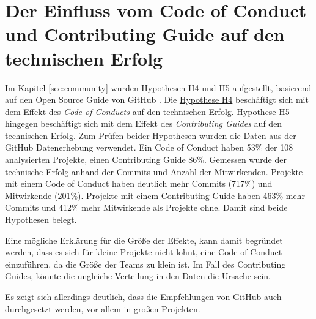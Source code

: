 



\section{Der Einfluss vom Code of Conduct und Contributing Guide auf den technischen Erfolg}

Im Kapitel \ref{sec:community} wurden Hypothesen H4 und H5 aufgestellt, basierend auf den Open Source
Guide von GitHub \cite{GitHubBuildingWelcomingCommunities2022}.
Die \hyperref[H:4]{Hypothese H4} beschäftigt sich mit dem Effekt des \textit{Code of Conducts} auf
den technischen Erfolg. \hyperref[H:5]{Hypothese H5} hingegen beschäftigt sich mit dem Effekt des
\textit{Contributing Guides} auf den technischen Erfolg.
Zum Prüfen beider Hypothesen wurden die Daten aus der GitHub Datenerhebung verwendet.
Ein Code of Conduct haben 53\% der 108 analysierten Projekte, einen Contributing Guide 86\%.
Gemessen wurde der technische Erfolg anhand der Commits und Anzahl der Mitwirkenden. Projekte mit
einem Code of Conduct haben deutlich mehr Commits (717\%) und Mitwirkende (201\%).
Projekte mit einem Contributing Guide haben 463\% mehr Commits und 412\% mehr Mitwirkende als Projekte
ohne.
Damit sind beide Hypothesen belegt.

Eine mögliche Erklärung für die Größe der Effekte, kann damit begründet werden, dass es sich für
kleine Projekte nicht lohnt, eine Code of Conduct einzuführen, da die Größe der Teams zu klein ist.
Im Fall des Contributing Guides, könnte die ungleiche Verteilung in den Daten die Ursache sein.

Es zeigt sich allerdings deutlich, dass die Empfehlungen von GitHub auch durchgesetzt werden, 
vor allem in großen Projekten.




